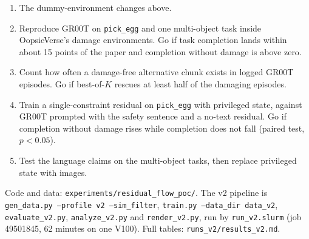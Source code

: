 \documentclass[11pt]{article}
\begin{document}
\begin{enumerate}
  \item The dummy-environment changes above.
  \item Reproduce GR00T on \texttt{pick\_egg} and one multi-object task inside OopsieVerse's damage
        environments. Go if task completion lands within about 15 points of the paper and completion
        without damage is above zero.
  \item Count how often a damage-free alternative chunk exists in logged GR00T episodes. Go if best-of-$K$
        rescues at least half of the damaging episodes.
  \item Train a single-constraint residual on \texttt{pick\_egg} with privileged state, against GR00T
        prompted with the safety sentence and a no-text residual. Go if completion without damage rises
        while completion does not fall (paired test, $p < 0.05$).
  \item Test the language claims on the multi-object tasks, then replace privileged state with images.
\end{enumerate}

\vspace{1em}
\begin{sloppypar}\noindent\small Code and data: \texttt{experiments/residual\_flow\_poc/}. The v2 pipeline is
\texttt{gen\_data.py --profile v2 --sim\_filter}, \texttt{train.py --data\_dir data\_v2},
\texttt{evaluate\_v2.py}, \texttt{analyze\_v2.py} and \texttt{render\_v2.py}, run by
\texttt{run\_v2.slurm} (job 49501845, 62 minutes on one V100). Full tables:
\texttt{runs\_v2/results\_v2.md}.\end{sloppypar}
\end{document}
